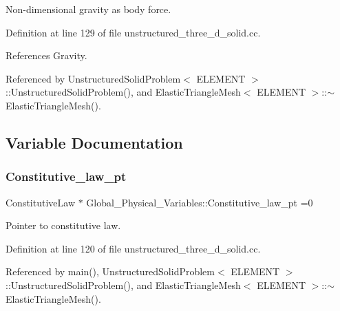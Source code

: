 Non-\/dimensional gravity as body force. 



Definition at line 129 of file unstructured\+\_\+three\+\_\+d\+\_\+solid.\+cc.



References Gravity.



Referenced by Unstructured\+Solid\+Problem$<$ E\+L\+E\+M\+E\+N\+T $>$\+::\+Unstructured\+Solid\+Problem(), and Elastic\+Triangle\+Mesh$<$ E\+L\+E\+M\+E\+N\+T $>$\+::$\sim$\+Elastic\+Triangle\+Mesh().



\subsection{Variable Documentation}
\mbox{\label{namespaceGlobal__Physical__Variables_a5d5f19442938130d36ee7476ae25049c}} 
\subsubsection{\texorpdfstring{Constitutive\+\_\+law\+\_\+pt}{Constitutive\_law\_pt}}
{\footnotesize\ttfamily Constitutive\+Law $\ast$ Global\+\_\+\+Physical\+\_\+\+Variables\+::\+Constitutive\+\_\+law\+\_\+pt =0}



Pointer to constitutive law. 



Definition at line 120 of file unstructured\+\_\+three\+\_\+d\+\_\+solid.\+cc.



Referenced by main(), Unstructured\+Solid\+Problem$<$ E\+L\+E\+M\+E\+N\+T $>$\+::\+Unstructured\+Solid\+Problem(), and Elastic\+Triangle\+Mesh$<$ E\+L\+E\+M\+E\+N\+T $>$\+::$\sim$\+Elastic\+Triangle\+Mesh().

\mbox{\label{namespaceGlobal__Physical__Variables_a8b80d3e8d63b8d0a0ed435a2dd7fe2ad}} 

